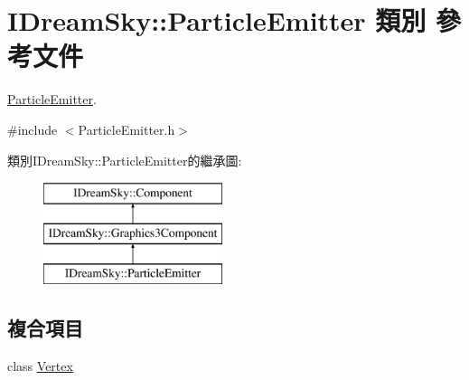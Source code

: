 \hypertarget{class_i_dream_sky_1_1_particle_emitter}{}\section{I\+Dream\+Sky\+:\+:Particle\+Emitter 類別 參考文件}
\label{class_i_dream_sky_1_1_particle_emitter}


\hyperlink{class_i_dream_sky_1_1_particle_emitter}{Particle\+Emitter}.  




{\ttfamily \#include $<$Particle\+Emitter.\+h$>$}

類別\+I\+Dream\+Sky\+:\+:Particle\+Emitter的繼承圖\+:\begin{figure}[H]
\begin{center}
\leavevmode
\includegraphics[height=3.000000cm]{class_i_dream_sky_1_1_particle_emitter}
\end{center}
\end{figure}
\subsection*{複合項目}
\begin{DoxyCompactItemize}
\item 
class \hyperlink{class_i_dream_sky_1_1_particle_emitter_1_1_vertex}{Vertex}
\end{DoxyCompactItemize}
